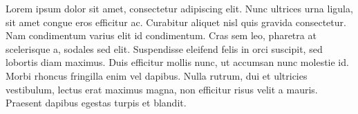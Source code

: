 Lorem ipsum dolor sit amet, consectetur adipiscing elit. Nunc ultrices urna ligula, sit amet congue eros efficitur ac. Curabitur aliquet nisl quis gravida consectetur. Nam condimentum varius elit id condimentum. Cras sem leo, pharetra at scelerisque a, sodales sed elit. Suspendisse eleifend felis in orci suscipit, sed lobortis diam maximus. Duis efficitur mollis nunc, ut accumsan nunc molestie id. Morbi rhoncus fringilla enim vel dapibus. Nulla rutrum, dui et ultricies vestibulum, lectus erat maximus magna, non efficitur risus velit a mauris. Praesent dapibus egestas turpis et blandit. 